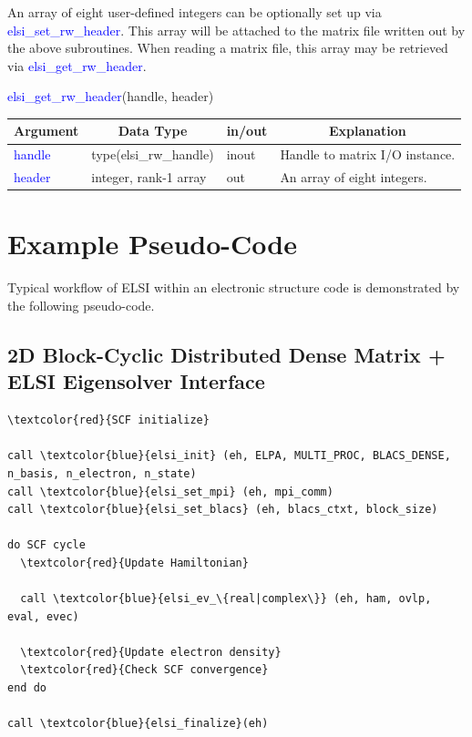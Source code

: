 \documentclass{report}
\begin{document}
An array of eight user-defined integers can be optionally set up via \textcolor{blue}{elsi\_set\_rw\_header}.  This array will be attached to the matrix file written out by the above subroutines.  When reading a matrix file, this array may be retrieved via \textcolor{blue}{elsi\_get\_rw\_header}.
\begin{labeling}{\hspace{6cm}}
\item [\hspace{0.3cm} \textcolor{blue}{elsi\_get\_rw\_header}(handle, header)]
\end{labeling}

\begin{tabular}[]{|p{20mm}|p{45mm}|p{15mm}|p{85mm}|}
\hline
\multicolumn{1}{|c|}{\textbf{Argument}} & \multicolumn{1}{c|}{\textbf{Data Type}} & \multicolumn{1}{c|}{\textbf{in/out}} & \multicolumn{1}{c|}{\textbf{Explanation}}\\
\hline
\textcolor{blue}{handle} & type(elsi\_rw\_handle) & inout & Handle to matrix I/O instance.\\
\hline
\textcolor{blue}{header} & integer, rank-1 array  & out   & An array of eight integers.\\
\hline
\end{tabular}

\section{Example Pseudo-Code}
\label{sec:example}
Typical workflow of ELSI within an electronic structure code is demonstrated by the following pseudo-code.

\subsection*{2D Block-Cyclic Distributed Dense Matrix + ELSI Eigensolver Interface}
\begin{tcolorbox}
\begin{Verbatim}[commandchars=\\\{\}]
\textcolor{red}{SCF initialize}

call \textcolor{blue}{elsi_init} (eh, ELPA, MULTI_PROC, BLACS_DENSE, n_basis, n_electron, n_state)
call \textcolor{blue}{elsi_set_mpi} (eh, mpi_comm)
call \textcolor{blue}{elsi_set_blacs} (eh, blacs_ctxt, block_size)

do SCF cycle
  \textcolor{red}{Update Hamiltonian}

  call \textcolor{blue}{elsi_ev_\{real|complex\}} (eh, ham, ovlp, eval, evec)

  \textcolor{red}{Update electron density}
  \textcolor{red}{Check SCF convergence}
end do

call \textcolor{blue}{elsi_finalize}(eh)
\end{Verbatim}
\end{tcolorbox}
\end{document}
